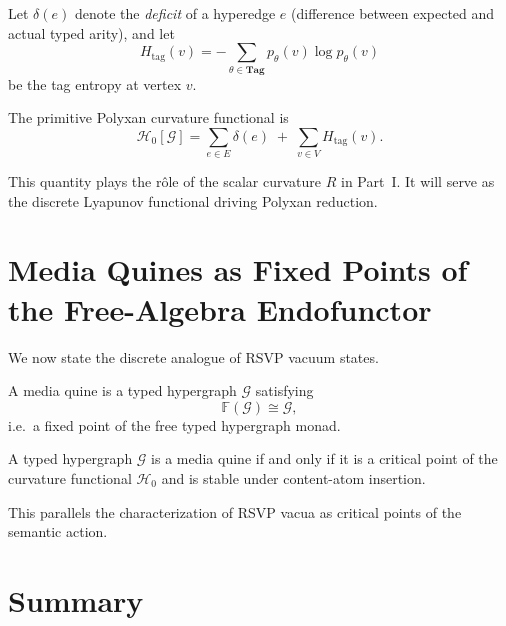 Let $\delta(e)$ denote the \emph{deficit} of a hyperedge $e$ (difference between
expected and actual typed arity), and let
\[
H_{\mathrm{tag}}(v) = -\sum_{\theta\in \mathbf{Tag}} p_\theta(v)\log p_\theta(v)
\]
be the tag entropy at vertex $v$.

\begin{definition}
The primitive Polyxan curvature functional is
\[
\mathcal{H}_0[\mathcal{G}]
=
\sum_{e\in E} \delta(e)
\;+\;
\sum_{v\in V} H_{\mathrm{tag}}(v).
\]
\end{definition}

This quantity plays the rôle of the scalar curvature $R$ in Part~I.
It will serve as the discrete Lyapunov functional driving Polyxan reduction.

\section{Media Quines as Fixed Points of the Free-Algebra Endofunctor}

We now state the discrete analogue of RSVP vacuum states.

\begin{definition}
A media quine is a typed hypergraph $\mathcal{G}$ satisfying
\[
\mathbb{F}(\mathcal{G}) \cong \mathcal{G},
\]
i.e.~a fixed point of the free typed hypergraph monad.
\end{definition}

\begin{theorem}
A typed hypergraph $\mathcal{G}$ is a media quine if and only if it is a
critical point of the curvature functional $\mathcal{H}_0$ and is stable under
content-atom insertion.
\end{theorem}

This parallels the characterization of RSVP vacua as critical points of the
semantic action.

\section{Summary}

